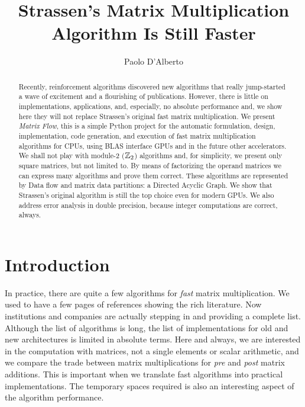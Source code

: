\documentclass[acmsmall]{acmart}
\begin{document}
\title{Strassen's Matrix Multiplication Algorithm Is Still Faster}

\author{Paolo D'Alberto}
\email{}

\renewcommand{\shortauthors}{D'Alberto et al.}

\begin{abstract}
  Recently, reinforcement algorithms discovered new algorithms that
  really jump-started a wave of excitement and a flourishing of
  publications. However, there is little on implementations,
  applications, and, especially, no absolute performance and, we show
  here they will not replace Strassen's original fast matrix
  multiplication.  We present {\em Matrix Flow}, this is a simple
  Python project for the automatic formulation, design,
  implementation, code generation, and execution of fast matrix
  multiplication algorithms for CPUs, using BLAS interface GPUs and in
  the future other accelerators. We shall not play with module-2
  ($\mathbb{Z}_2$) algorithms and, for simplicity, we present only square
  matrices, but not limited to. By means of factorizing the operand
  matrices we can express many algorithms and prove them
  correct. These algorithms are represented by Data flow and matrix
  data partitions: a Directed Acyclic Graph. We show that Strassen's
  original algorithm is still the top choice even for modern GPUs. We
  also address error analysis in double precision, because integer
  computations are correct, always.
\end{abstract}

\maketitle

\section{Introduction} 
\label{sec:introduction}
In practice, there are quite a few algorithms for {\em fast} matrix
multiplication. We used to have a few pages of references showing the
rich literature. Now institutions and companies are actually stepping
in and providing a complete list. Although the list of algorithms is
long, the list of implementations for old and new architectures is
limited in absolute terms. Here and always, we are interested in the
computation with matrices, not a single elements or scalar arithmetic,
and we compare the trade between matrix multiplications for {\em pre}
and {\em post} matrix additions.  This is important when we translate
fast algorithms into practical implementations. The temporary spaces
required is also an interesting aspect of the algorithm performance.
\end{document}
